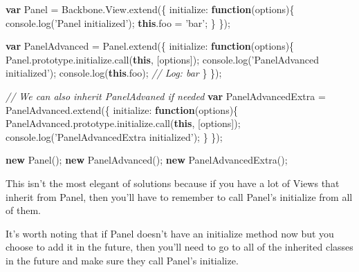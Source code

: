 \documentclass[9pt]{book}
\newenvironment{Shaded}{}{}
\newcommand{\KeywordTok}[1]{\textcolor[rgb]{0.00,0.44,0.13}{\textbf{{#1}}}}
\newcommand{\DataTypeTok}[1]{\textcolor[rgb]{0.56,0.13,0.00}{{#1}}}
\newcommand{\StringTok}[1]{\textcolor[rgb]{0.25,0.44,0.63}{{#1}}}
\newcommand{\CommentTok}[1]{\textcolor[rgb]{0.38,0.63,0.69}{\textit{{#1}}}}
\newcommand{\OtherTok}[1]{\textcolor[rgb]{0.00,0.44,0.13}{{#1}}}
\newcommand{\FunctionTok}[1]{\textcolor[rgb]{0.02,0.16,0.49}{{#1}}}
\newcommand{\NormalTok}[1]{{#1}}
\begin{document}
\begin{Shaded}
\begin{Highlighting}[]
\KeywordTok{var} \NormalTok{Panel = }\OtherTok{Backbone}\NormalTok{.}\OtherTok{View}\NormalTok{.}\FunctionTok{extend}\NormalTok{(\{}
  \DataTypeTok{initialize}\NormalTok{: }\KeywordTok{function}\NormalTok{(options)\{}
    \OtherTok{console}\NormalTok{.}\FunctionTok{log}\NormalTok{(}\StringTok{'Panel initialized'}\NormalTok{);}
    \KeywordTok{this}\NormalTok{.}\FunctionTok{foo} \NormalTok{= }\StringTok{'bar'}\NormalTok{;}
  \NormalTok{\}}
\NormalTok{\});}

\KeywordTok{var} \NormalTok{PanelAdvanced = }\OtherTok{Panel}\NormalTok{.}\FunctionTok{extend}\NormalTok{(\{}
  \DataTypeTok{initialize}\NormalTok{: }\KeywordTok{function}\NormalTok{(options)\{}
    \OtherTok{Panel}\NormalTok{.}\OtherTok{prototype}\NormalTok{.}\OtherTok{initialize}\NormalTok{.}\FunctionTok{call}\NormalTok{(}\KeywordTok{this}\NormalTok{, [options]);}
    \OtherTok{console}\NormalTok{.}\FunctionTok{log}\NormalTok{(}\StringTok{'PanelAdvanced initialized'}\NormalTok{);}
    \OtherTok{console}\NormalTok{.}\FunctionTok{log}\NormalTok{(}\KeywordTok{this}\NormalTok{.}\FunctionTok{foo}\NormalTok{); }\CommentTok{// Log: bar}
  \NormalTok{\}}
\NormalTok{\});}

\CommentTok{// We can also inherit PanelAdvaned if needed}
\KeywordTok{var} \NormalTok{PanelAdvancedExtra = }\OtherTok{PanelAdvanced}\NormalTok{.}\FunctionTok{extend}\NormalTok{(\{}
  \DataTypeTok{initialize}\NormalTok{: }\KeywordTok{function}\NormalTok{(options)\{}
    \OtherTok{PanelAdvanced}\NormalTok{.}\OtherTok{prototype}\NormalTok{.}\OtherTok{initialize}\NormalTok{.}\FunctionTok{call}\NormalTok{(}\KeywordTok{this}\NormalTok{, [options]);}
    \OtherTok{console}\NormalTok{.}\FunctionTok{log}\NormalTok{(}\StringTok{'PanelAdvancedExtra initialized'}\NormalTok{);}
  \NormalTok{\}}
\NormalTok{\});}

\KeywordTok{new} \FunctionTok{Panel}\NormalTok{();}
\KeywordTok{new} \FunctionTok{PanelAdvanced}\NormalTok{();}
\KeywordTok{new} \FunctionTok{PanelAdvancedExtra}\NormalTok{();}
\end{Highlighting}
\end{Shaded}

This isn't the most elegant of solutions because if you have a lot of
Views that inherit from Panel, then you'll have to remember to call
Panel's initialize from all of them.

It's worth noting that if Panel doesn't have an initialize method now
but you choose to add it in the future, then you'll need to go to all of
the inherited classes in the future and make sure they call Panel's
initialize.
\end{document}
